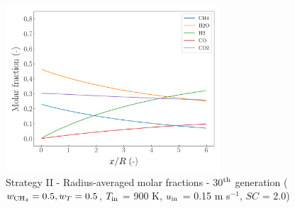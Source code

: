 \documentclass[preprint,12pt]{elsarticle}
\begin{document}
%

\begin{figure}[h!]
\centering
\includegraphics[width=80mm]{results/5Eq/50C_50T/GEN30-AVG.png}
\caption{\label{fig:5RES5050G30-avg} Strategy II - Radius-averaged molar fractions -  30$^{\rm{th}}$ generation ($w_{\rm{CH_4}} = 0.5, w_T = 0.5$, $T_{\rm{in}}$ = 900 K, $u_{\rm{in}}$ = 0.15 m s$^{-1}$, $SC$ = 2.0)}
\end{figure}
\end{document}

